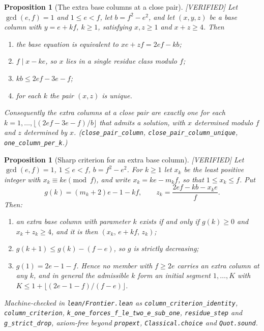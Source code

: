 \documentclass[11pt,reqno]{amsart}
\theoremstyle{plain}
\newtheorem{proposition}[theorem]{Proposition}
\theoremstyle{definition}
\newcommand{\lab}[1]{\hfill\textnormal{\footnotesize\textsc{[#1]}}}
\begin{document}
\begin{proposition}[The extra base columns at a close pair]\label{prop:closepaircolumns}\lab{VERIFIED}
Let $\gcd(e,f)=1$ and $1\le e<f$, let $b=f^2-e^2$, and let $(x,y,z)$ be a base column with
$y=e+kf$, $k\ge1$, satisfying $x,z\ge1$ and $x+z\ge4$. Then
\begin{enumerate}
\item[\textup{(i)}] the base equation is equivalent to $xe+zf=2ef-kb$;
\item[\textup{(ii)}] $f\mid x-ke$, so $x$ lies in a single residue class modulo $f$;
\item[\textup{(iii)}] $kb\le 2ef-3e-f$;
\item[\textup{(iv)}] for each $k$ the pair $(x,z)$ is unique.
\end{enumerate}
Consequently the extra columns at a close pair are exactly one for each
$k=1,\dots,\lfloor(2ef-3e-f)/b\rfloor$ that admits a solution, with $x$ determined modulo $f$ and $z$
determined by $x$.
\textup{(\texttt{close\_pair\_column}, \texttt{close\_pair\_column\_unique}, \texttt{one\_column\_per\_k}.)}
\end{proposition}

\begin{proposition}[Sharp criterion for an extra base column]\label{prop:sharpcolumn}\lab{VERIFIED}
Let $\gcd(e,f)=1$, $1\le e<f$, $b=f^2-e^2$. For $k\ge1$ let $x_k$ be the least positive integer with
$x_k\equiv ke\pmod f$, and write $x_k=ke-m_kf$, so that $1\le x_k\le f$. Put
\[
g(k)=(m_k+2)e-1-kf, \qquad z_k=\frac{2ef-kb-x_ke}{f}.
\]
Then:
\begin{enumerate}
\item[\textup{(i)}] an extra base column with parameter $k$ exists if and only if $g(k)\ge0$ and
$x_k+z_k\ge4$, and it is then $(x_k,\,e+kf,\,z_k)$;
\item[\textup{(ii)}] $g(k+1)\le g(k)-(f-e)$, so $g$ is strictly decreasing;
\item[\textup{(iii)}] $g(1)=2e-1-f$. Hence no member with $f\ge 2e$ carries an extra column at any
$k$, and in general the admissible $k$ form an initial segment $1,\dots,K$ with
$K\le 1+\lfloor(2e-1-f)/(f-e)\rfloor$.
\end{enumerate}
\textup{Machine-checked in \texttt{lean/Frontier.lean} as
\texttt{column\_criterion\_identity}, \texttt{column\_criterion},
\texttt{k\_one\_forces\_f\_le\_two\_e\_sub\_one}, \texttt{residue\_step} and
\texttt{g\_strict\_drop}, axiom-free beyond \texttt{propext}, \texttt{Classical.choice} and
\texttt{Quot.sound}.}
\end{proposition}
\end{document}
